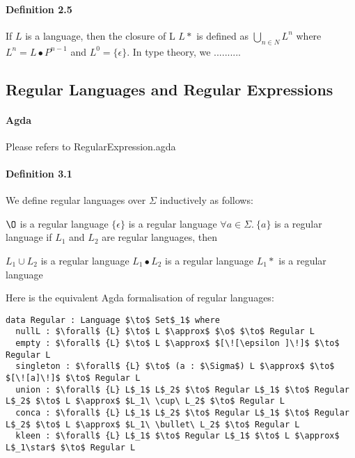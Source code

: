 \documentclass[twoside,openright,final]{bhamthesis}
\renewcommand{\item}{\itemindent0.5cm\itemold}
\begin{document}
\paragraph{Definition 2.5} If \(L\) is a language, then the closure of
L \(L\ast\) is defined as \( \bigcup_{n \in N} L^n \) where
\( L^n = L\bullet P^{n - 1} \) and \(L^0 = \{\epsilon\}\). In type
theory, we ..........

\subsection{Regular Languages and Regular Expressions}
\paragraph{Agda} Please refers to RegularExpression.agda

\paragraph{Definition 3.1} We define regular languages over
\(\Sigma\) inductively as follows:
\begin{enumerate}
  \item \(\O\) is a regular language
  \item \(\{\epsilon\}\) is a regular language
  \item \(\forall a\in\Sigma.\ \{a\}\) is a regular language
  \item if \(L_1\) and \(L_2\) are regular languages, then
    \begin{enumerate}
      \item \(L_1\cup L_2\) is a regular language
      \item \(L_1\bullet L_2\) is a regular language
      \item \(L_1\ast\) is a regular language
    \end{enumerate}
\end{enumerate}
\par Here is the equivalent Agda formalisation of regular languages:

\begin{lstlisting}[caption=Regular Language,mathescape=true]
data Regular : Language $\to$ Set$_1$ where
  nullL : $\forall$ {L} $\to$ L $\approx$ $\o$ $\to$ Regular L
  empty : $\forall$ {L} $\to$ L $\approx$ $[\![\epsilon ]\!]$ $\to$ Regular L
  singleton : $\forall$ {L} $\to$ (a : $\Sigma$) L $\approx$ $\to$ $[\![a]\!]$ $\to$ Regular L
  union : $\forall$ {L} L$_1$ L$_2$ $\to$ Regular L$_1$ $\to$ Regular L$_2$ $\to$ L $\approx$ $L_1\ \cup\ L_2$ $\to$ Regular L
  conca : $\forall$ {L} L$_1$ L$_2$ $\to$ Regular L$_1$ $\to$ Regular L$_2$ $\to$ L $\approx$ $L_1\ \bullet\ L_2$ $\to$ Regular L
  kleen : $\forall$ {L} L$_1$ $\to$ Regular L$_1$ $\to$ L $\approx$ L$_1\star$ $\to$ Regular L
\end{lstlisting}
\end{document}
